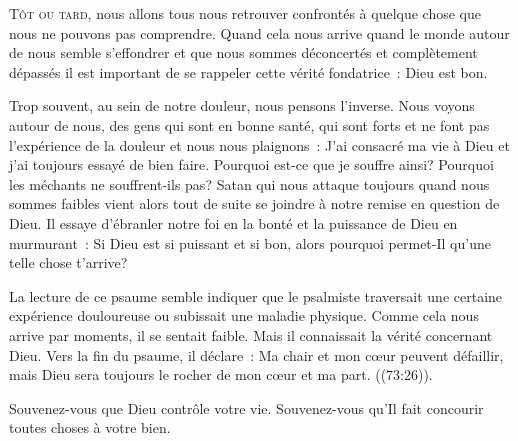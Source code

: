 


\lettrine{T}{ôt ou tard,} nous allons tous nous retrouver confrontés
 à quelque chose que nous ne pouvons pas comprendre.
 Quand cela nous arrive \ocadr quand le monde autour de nous semble s'effondrer
 et que nous sommes déconcertés et complètement dépassés \fcadr{}
 il est important de se rappeler cette vérité fondatrice~: Dieu est bon.

Trop souvent, au sein de notre douleur, nous pensons l'inverse.
 Nous voyons autour de nous, des gens qui sont en bonne santé,
 qui sont forts et ne font pas l'expérience de la douleur
 et nous nous plaignons~:
 \Og J'ai consacré ma vie à Dieu et j'ai toujours essayé de bien faire.
 Pourquoi est-ce que je souffre ainsi?
 Pourquoi les méchants ne souffrent-ils pas? \Fg{}
 Satan \ocadr qui nous attaque toujours quand nous sommes faibles \fcadr{}
 vient alors tout de suite se joindre à notre remise en question de Dieu.
 Il essaye d'ébranler notre foi en la bonté et la puissance de Dieu
 en murmurant~:
 \Og Si Dieu est si puissant et si bon, alors pourquoi permet-Il
 qu'une telle chose t'arrive? \Fg{}


La lecture de ce psaume semble indiquer que le psalmiste traversait
 une certaine expérience douloureuse ou subissait une maladie physique.
 Comme cela nous arrive par moments, il se sentait faible.
 Mais il connaissait la vérité concernant Dieu.
 Vers la fin du psaume, il déclare~:
 \Og Ma chair et mon c\oe{}ur peuvent défaillir,
 mais Dieu sera toujours le rocher de mon c\oe{}ur et ma part. \Fg{}
 ((73:26)).

Souvenez-vous que Dieu contrôle votre vie.
 Souvenez-vous qu'Il fait concourir toutes choses à votre bien. 

\dvrule




